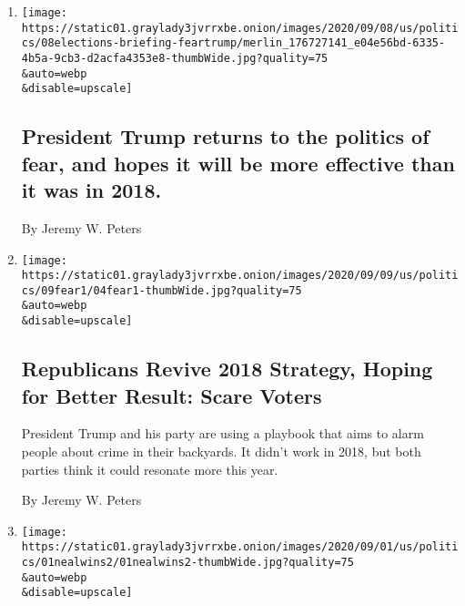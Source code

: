 \begin{enumerate}
\def\labelenumi{\arabic{enumi}.}
\item
  \href{/2020/09/08/us/elections/president-trump-returns-to-the-politics-of-fear-and-hopes-it-will-be-more-effective-than-it-was-in-2018.html}{}

  \texttt{[image: https://static01.graylady3jvrrxbe.onion/images/2020/09/08/us/politics/08elections-briefing-feartrump/merlin\_176727141\_e04e56bd-6335-4b5a-9cb3-d2acfa4353e8-thumbWide.jpg?quality=75\\\&auto=webp\\\&disable=upscale]}

  \hypertarget{president-trump-returns-to-the-politics-of-fear-and-hopes-it-will-be-more-effective-than-it-was-in-2018}{%
  \subsection{President Trump returns to the politics of fear, and hopes
  it will be more effective than it was in
  2018.}\label{president-trump-returns-to-the-politics-of-fear-and-hopes-it-will-be-more-effective-than-it-was-in-2018}}

  By Jeremy W. Peters
\item
  \href{/2020/09/08/us/politics/trump-republicans-fear-strategy.html}{}

  \texttt{[image: https://static01.graylady3jvrrxbe.onion/images/2020/09/09/us/politics/09fear1/04fear1-thumbWide.jpg?quality=75\\\&auto=webp\\\&disable=upscale]}

  \hypertarget{republicans-revive-2018-strategy-hoping-for-better-result-scare-voters}{%
  \subsection{Republicans Revive 2018 Strategy, Hoping for Better
  Result: Scare
  Voters}\label{republicans-revive-2018-strategy-hoping-for-better-result-scare-voters}}

  President Trump and his party are using a playbook that aims to alarm
  people about crime in their backyards. It didn't work in 2018, but
  both parties think it could resonate more this year.

  By Jeremy W. Peters
\item
  \href{/2020/09/01/us/politics/neal-morse.html}{}

  \texttt{[image: https://static01.graylady3jvrrxbe.onion/images/2020/09/01/us/politics/01nealwins2/01nealwins2-thumbWide.jpg?quality=75\\\&auto=webp\\\&disable=upscale]}

  \hypertarget{richard-neal-powerful-house-democrat-fights-off-challenge-from-his-left}{%
}
\end{enumerate}
